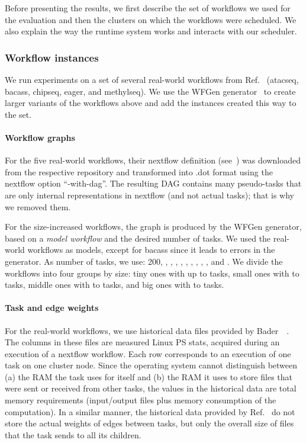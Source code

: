 \documentclass[conference]{IEEEtran}
\begin{document}
Before presenting the results, we first describe the set of workflows we used for the evaluation and
then the clusters on which the workflows were scheduled.
We also explain the way the runtime system works and interacts with our scheduler. 

\subsubsection{Workflow instances}
We run experiments on a set of several real-world workflows from Ref.~\cite{lotaru}
(atacseq, bacass, chipseq, eager, and methylseq). We use the WFGen generator~\cite{COLEMAN202216} to
create larger variants of the workflows above and add the instances created this way to the set.


\paragraph{Workflow graphs}
For the five real-world workflows, their nextflow definition (see~\cite{ewels2020nf}) was downloaded from the
respective repository and transformed into .dot format using the nextflow option ``-with-dag''.
The resulting DAG contains many pseudo-tasks that are only internal representations in nextflow
(and not actual tasks); that is why we removed them.

For the size-increased workflows, the graph is produced by the WFGen generator, based on a {\em model workflow} and
the desired number of tasks.
We used the real-world workflows as models, except for bacass since it leads to errors in the generator.
%
As number of tasks, we use: 200, , , , , ,
, , , , and .
We divide the workflows into four groups by size: tiny ones with up to  tasks, small ones with  to  tasks,
middle ones with  to  tasks, and big ones with  to  tasks.

\paragraph{Task and edge weights}
For the real-world workflows, we use historical data files provided by Bader~\etal~\cite{lotaru}.
The columns in these files are measured Linux PS stats, acquired during an execution of a nextflow workflow.
Each row corresponds to an execution of one task on one cluster node.
Since the operating system cannot distinguish between (a) the RAM the task uses for itself and (b) the RAM it uses
to store files that were sent or received from other tasks, the values in the historical data are total memory requirements (input/output files plus memory consumption of the computation).
In a similar manner, the historical data provided by Ref.~\cite{lotaru} do not store the actual weights of edges between tasks, but only the overall
size of files that the task sends to all its children.
\end{document}
